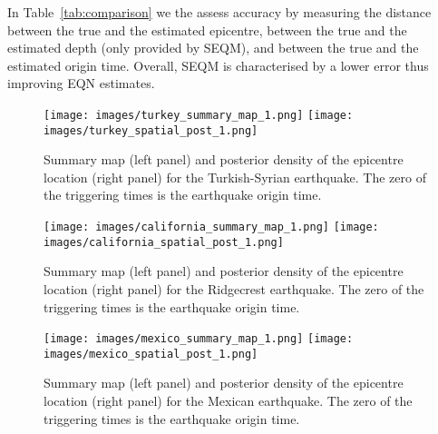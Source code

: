 \documentclass[final]{statsoc}
\begin{document}
In Table~\ref{tab:comparison} we the assess accuracy by measuring the distance between the true and the estimated epicentre, between the true and the estimated depth (only provided by SEQM), and between the true and the estimated origin time. Overall, SEQM is characterised by a lower error thus improving EQN estimates. 



\begin{figure}
    \centering
         \texttt{[image: images/turkey\_summary\_map\_1.png]}
        \texttt{[image: images/turkey\_spatial\_post\_1.png]}
    \caption{Summary map (left panel) and posterior density of the epicentre location (right panel) for the Turkish-Syrian earthquake. The zero of the triggering times is the earthquake origin time.
    }
    \label{fig:summary_turkey}
\end{figure}

\begin{figure}
    \centering
        \texttt{[image: images/california\_summary\_map\_1.png]}
        \texttt{[image: images/california\_spatial\_post\_1.png]}
    \caption{Summary map (left panel) and posterior density of the epicentre location (right panel) for the Ridgecrest earthquake. The zero of the triggering times is the earthquake origin time. 
    }
    \label{fig:summary_california}
\end{figure}

\begin{figure}
    \centering
        \texttt{[image: images/mexico\_summary\_map\_1.png]}
         \texttt{[image: images/mexico\_spatial\_post\_1.png]}
    \caption{Summary map (left panel) and posterior density of the epicentre location (right panel) for the Mexican earthquake. The zero of the triggering times is the earthquake origin time. 
    }
    \label{fig:summary_mexico}
\end{figure}
\end{document}
